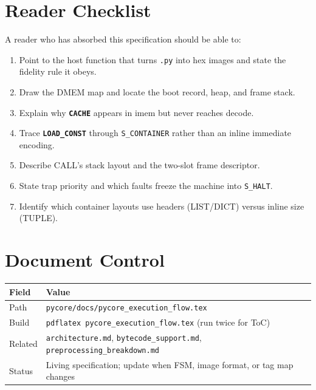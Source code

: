 \documentclass[11pt,a4paper]{article}
\newcommand{\opcode}[1]{\texttt{\textbf{#1}}}
\begin{document}
\section{Reader Checklist}
\label{sec:checklist}

A reader who has absorbed this specification should be able to:

\begin{enumerate}[leftmargin=*]
  \item Point to the host function that turns \texttt{.py} into hex images and
        state the fidelity rule it obeys.
  \item Draw the DMEM map and locate the boot record, heap, and frame stack.
  \item Explain why \opcode{CACHE} appears in imem but never reaches decode.
  \item Trace \opcode{LOAD\_CONST} through \texttt{S\_CONTAINER} rather than an
        inline immediate encoding.
  \item Describe CALL's stack layout and the two-slot frame descriptor.
  \item State trap priority and which faults freeze the machine into
        \texttt{S\_HALT}.
  \item Identify which container layouts use headers (LIST/DICT) versus inline
        size (TUPLE).
\end{enumerate}

\section{Document Control}
\label{sec:control}

\begin{center}
\begin{tabular}{@{}ll@{}}
\toprule
Field & Value \\
\midrule
Path & \texttt{pycore/docs/pycore\_execution\_flow.tex} \\
Build & \texttt{pdflatex pycore\_execution\_flow.tex} (run twice for ToC) \\
Related & \texttt{architecture.md}, \texttt{bytecode\_support.md},
          \texttt{preprocessing\_breakdown.md} \\
Status & Living specification; update when FSM, image format, or tag map changes \\
\bottomrule
\end{tabular}
\end{center}
\end{document}
